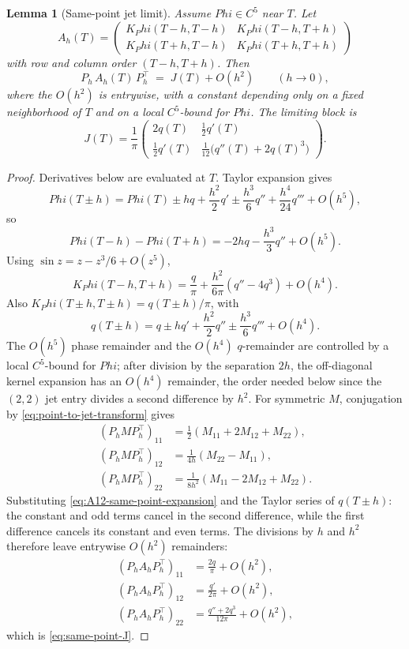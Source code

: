 \documentclass[11pt,a4paper]{amsart}
\def\Phi{Phi}%
\numberwithin{equation}{section}
\theoremstyle{plain}
\newtheorem{lemma}[theorem]{Lemma}
\theoremstyle{definition}
\newcommand{\Ph}{\Phi}
\begin{document}
\begin{lemma}[Same-point jet limit]
\label{lem:same-point-jet-limit}
Assume \(\Ph\in C^5\) near \(T\).  Let
\[
A_h(T)=
\begin{pmatrix}
K_\Ph(T-h,T-h) & K_\Ph(T-h,T+h)\\
K_\Ph(T+h,T-h) & K_\Ph(T+h,T+h)
\end{pmatrix}
\]
with row and column order \((T-h, T+h)\).  Then
\[
        P_h\,A_h(T)\,P_h^\top \;=\; J(T) + O(h^2)
        \qquad (h\to 0),
\]
where the \(O(h^2)\) is entrywise, with a constant depending only on a
fixed neighborhood of \(T\) and on a local \(C^5\)-bound for \(\Ph\).  The
limiting block is
\begin{equation}
\label{eq:same-point-J}
J(T)=\frac1\pi
\begin{pmatrix}
2q(T) & \tfrac12 q'(T)\\[1ex]
\tfrac12 q'(T) & \tfrac1{12}\bigl(q''(T)+2q(T)^3\bigr)
\end{pmatrix}.
\end{equation}
\end{lemma}

\begin{proof}
Derivatives below are evaluated at \(T\).  Taylor expansion gives
\[
\Ph(T\pm h) = \Ph(T) \pm hq + \frac{h^2}{2}q'
            \pm \frac{h^3}{6}q'' + \frac{h^4}{24}q'''
            + O(h^5),
\]
so
\[
\Ph(T-h)-\Ph(T+h) = -2hq - \frac{h^3}{3}q'' + O(h^5).
\]
Using \(\sin z = z - z^3/6 + O(z^5)\),
\begin{equation}
\label{eq:A12-same-point-expansion}
K_\Ph(T-h, T+h)
= \frac{q}{\pi} + \frac{h^2}{6\pi}(q'' - 4q^3) + O(h^4).
\end{equation}
Also \(K_\Ph(T\pm h,T\pm h)=q(T\pm h)/\pi\), with
\[
q(T\pm h)=q\pm hq'+\frac{h^2}{2}q''
          \pm\frac{h^3}{6}q'''+O(h^4).
\]
The \(O(h^5)\) phase remainder and the \(O(h^4)\) \(q\)-remainder are
controlled by a local \(C^5\)-bound for \(\Ph\); after division by the
separation \(2h\), the off-diagonal kernel expansion has an \(O(h^4)\)
remainder, the order needed below since the \((2,2)\) jet entry
divides a second difference by \(h^2\).
For symmetric \(M\), conjugation by \eqref{eq:point-to-jet-transform}
gives
\begin{align*}
(P_h M P_h^\top)_{11} &= \tfrac12(M_{11}+2M_{12}+M_{22}),\\
(P_h M P_h^\top)_{12} &= \tfrac{1}{4h}(M_{22}-M_{11}),\\
(P_h M P_h^\top)_{22} &= \tfrac{1}{8h^2}(M_{11}-2M_{12}+M_{22}).
\end{align*}
Substituting \eqref{eq:A12-same-point-expansion} and the Taylor series
of \(q(T\pm h)\): the constant and odd terms cancel in the second
difference, while the first difference cancels its constant and even
terms.  The divisions by \(h\) and \(h^2\) therefore leave entrywise
\(O(h^2)\) remainders:
\begin{align*}
(P_h A_h P_h^\top)_{11} &= \frac{2q}{\pi} + O(h^2),\\
(P_h A_h P_h^\top)_{12} &= \frac{q'}{2\pi} + O(h^2),\\
(P_h A_h P_h^\top)_{22} &= \frac{q''+2q^3}{12\pi} + O(h^2),
\end{align*}
which is \eqref{eq:same-point-J}.
\end{proof}
\end{document}
